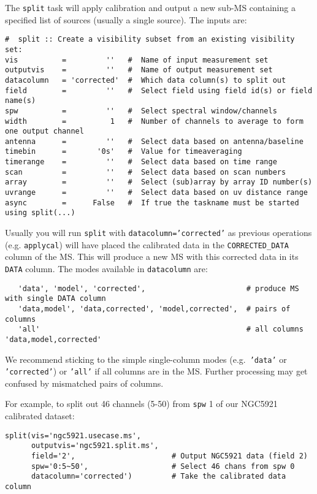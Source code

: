 {The {\tt split} task will apply calibration and output a new sub-MS
containing a specified list of sources (usually a single source).
The inputs are:
\small
\begin{verbatim}
#  split :: Create a visibility subset from an existing visibility set:
vis          =         ''   #  Name of input measurement set
outputvis    =         ''   #  Name of output measurement set
datacolumn   = 'corrected'  #  Which data column(s) to split out
field        =         ''   #  Select field using field id(s) or field name(s)
spw          =         ''   #  Select spectral window/channels
width        =          1   #  Number of channels to average to form one output channel
antenna      =         ''   #  Select data based on antenna/baseline
timebin      =       '0s'   #  Value for timeaveraging
timerange    =         ''   #  Select data based on time range
scan         =         ''   #  Select data based on scan numbers
array        =         ''   #  Select (sub)array by array ID number(s)
uvrange      =         ''   #  Select data based on uv distance range
async        =      False   #  If true the taskname must be started using split(...)
\end{verbatim}
\normalsize

Usually you will run {\tt split} with {\tt datacolumn='corrected'} as
previous operations (e.g. {\tt applycal}) will have placed the
calibrated data in the {\tt CORRECTED\_DATA} column of the MS.  This
will produce a new MS with this corrected data in its {\tt DATA} 
column.  The modes available in {\tt datacolumn} are:
\small
\begin{verbatim}
   'data', 'model', 'corrected',                       # produce MS with single DATA column
   'data,model', 'data,corrected', 'model,corrected',  # pairs of columns
   'all'                                               # all columns 'data,model,corrected'
\end{verbatim}
\normalsize
We recommend sticking to the simple single-column modes (e.g.\ 
{\tt 'data'} or {\tt 'corrected'}) or {\tt 'all'} if all columns are in
the MS.  Further processing may get confused by mismatched pairs of columns.

For example, to split out 46 channels (5-50) from {\tt spw} 1 of
our NGC5921 calibrated dataset:
\small
\begin{verbatim}
split(vis='ngc5921.usecase.ms',       
      outputvis='ngc5921.split.ms',    
      field='2',                      # Output NGC5921 data (field 2)
      spw='0:5~50',                   # Select 46 chans from spw 0
      datacolumn='corrected')         # Take the calibrated data column
\end{verbatim}
\normalsize

}

